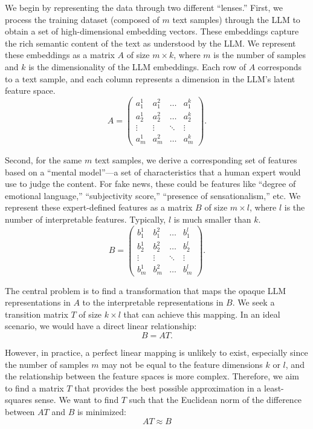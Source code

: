 \documentclass[ai,article,submit,pdftex,moreauthors]{Definitions/mdpi}
\begin{document}
We begin by representing the data through two different ``lenses.'' First, we process the training dataset (composed of $m$ text samples) through the LLM to obtain a set of high-dimensional embedding vectors. These embeddings capture the rich semantic content of the text as understood by the LLM. We represent these embeddings as a matrix $A$ of size $m \times k$, where $m$ is the number of samples and $k$ is the dimensionality of the LLM embeddings. Each row of $A$ corresponds to a text sample, and each column represents a dimension in the LLM's latent feature space.
\begin{equation}
A = \begin{pmatrix}
 a_1^1 & a_1^2 & \dots & a_1^k \\
 a_2^1 & a_2^2 & \dots & a_2^k \\
 \vdots & \vdots & \ddots & \vdots \\
 a_m^1 & a_m^2 & \dots & a_m^k 
\end{pmatrix}.
\end{equation}

Second, for the same $m$ text samples, we derive a corresponding set of features based on a ``mental model''---a set of characteristics that a human expert would use to judge the content. For fake news, these could be features like ``degree of emotional language,'' ``subjectivity score,'' ``presence of sensationalism,'' etc. We represent these expert-defined features as a matrix $B$ of size $m \times l$, where $l$ is the number of interpretable features. Typically, $l$ is much smaller than $k$.
\begin{equation}
B = \begin{pmatrix}
 b_1^1 & b_1^2 & \dots & b_1^l \\
 b_2^1 & b_2^2 & \dots & b_2^l \\
 \vdots & \vdots & \ddots & \vdots \\
 b_m^1 & b_m^2 & \dots & b_m^l 
\end{pmatrix}.
\end{equation}

The central problem is to find a transformation that maps the opaque LLM representations in $A$ to the interpretable representations in $B$. We seek a transition matrix $T$ of size $k \times l$ that can achieve this mapping. In an ideal scenario, we would have a direct linear relationship:
\begin{equation}
B = A T.
\end{equation}

However, in practice, a perfect linear mapping is unlikely to exist, especially since the number of samples $m$ may not be equal to the feature dimensions $k$ or $l$, and the relationship between the feature spaces is more complex. Therefore, we aim to find a matrix $T$ that provides the best possible approximation in a least-squares sense. We want to find $T$ such that the Euclidean norm of the difference between $A T$ and $B$ is minimized:
\begin{equation}
AT \approx B
\end{equation}
\end{document}
